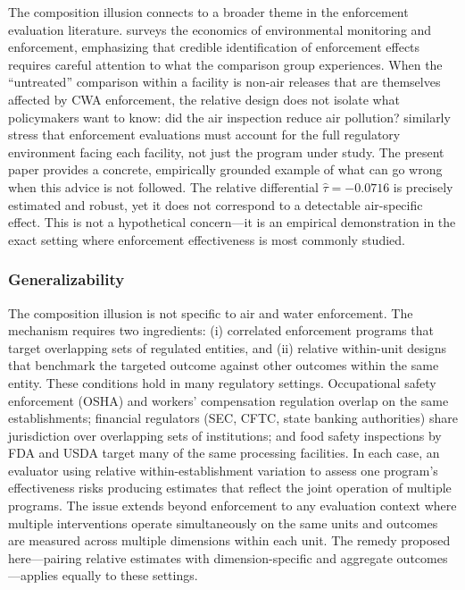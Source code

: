 \documentclass[12pt]{article}
\begin{document}
The composition illusion connects to a broader theme in the enforcement evaluation literature. \citet{shimshack2015enforcement} surveys the economics of environmental monitoring and enforcement, emphasizing that credible identification of enforcement effects requires careful attention to what the comparison group experiences. When the ``untreated'' comparison within a facility is non-air releases that are themselves affected by CWA enforcement, the relative design does not isolate what policymakers want to know: did the air inspection reduce air pollution? \citet{gray2011effectiveness} similarly stress that enforcement evaluations must account for the full regulatory environment facing each facility, not just the program under study. The present paper provides a concrete, empirically grounded example of what can go wrong when this advice is not followed. The relative differential $\hat{\tau} = -0.0716$ is precisely estimated and robust, yet it does not correspond to a detectable air-specific effect. This is not a hypothetical concern---it is an empirical demonstration in the exact setting where enforcement effectiveness is most commonly studied.

\subsubsection*{Generalizability} The composition illusion is not specific to air and water enforcement. The mechanism requires two ingredients: (i) correlated enforcement programs that target overlapping sets of regulated entities, and (ii) relative within-unit designs that benchmark the targeted outcome against other outcomes within the same entity. These conditions hold in many regulatory settings. Occupational safety enforcement (OSHA) and workers' compensation regulation overlap on the same establishments; financial regulators (SEC, CFTC, state banking authorities) share jurisdiction over overlapping sets of institutions; and food safety inspections by FDA and USDA target many of the same processing facilities. In each case, an evaluator using relative within-establishment variation to assess one program's effectiveness risks producing estimates that reflect the joint operation of multiple programs. The issue extends beyond enforcement to any evaluation context where multiple interventions operate simultaneously on the same units and outcomes are measured across multiple dimensions within each unit. The remedy proposed here---pairing relative estimates with dimension-specific and aggregate outcomes---applies equally to these settings.
\end{document}
